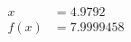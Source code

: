 \documentclass[preview]{standalone}
\begin{document}
\begin{align*}
x &= 4.9792\\f(x) &= 7.9999458
\end{align*}
\end{document}
